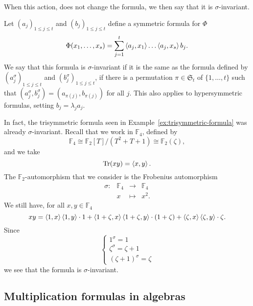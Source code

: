 When this action, does not change the formula, we then say that it is
$\sigma$-invariant.
\begin{defi}
  Let $(a_j)_{1\leq j\leq t}$ and
$(b_j)_{1\leq j\leq t}$ define a symmetric formula for $\Phi$
  \[
    \Phi(x_1, \dots, x_s) = \sum_{j=1}^t\left\langle a_j,x_1\right\rangle\dots\left\langle a_j,x_s\right\rangle b_j.
  \]
We say that this
formula is $\sigma$-invariant if it is the same as the formula defined by
$(a_j^\sigma)_{1\leq j\leq t}$ and $(b_j^\sigma)_{1\leq j\leq t}$,
\ie if there is a permutation $\pi\in\mathfrak S_t$ of $\{1,\dots,t\}$ such that
$(a_j^\sigma,b_j^\sigma)=(a_{\pi(j)},b_{\pi(j)})$ for all $j$. This also applies
to hypersymmetric formulas, setting $b_j=\lambda_j a_j$. 
\end{defi}
\begin{ex}
  In fact, the trisymmetric formula seen in
  Example~\ref{ex:trisymmetric-formula} was already $\sigma$-invariant. Recall
  that we work in $\mathbb{F}_4$, defined by
  \[
   \mathbb{F}_4\cong\mathbb{F}_2[T]/(T^2+T+1)\cong\mathbb{F}_2(\zeta),
  \]
  and we take
\[
  \operatorname{Tr}(xy) = \left\langle x,y\right\rangle.
\]
The $\mathbb{F}_2$-automorphism that we consider is the Frobenius automorphism
\[
  \begin{array}{cccc}
    \sigma: & \mathbb{F}_4 & \to & \mathbb{F}_4 \\
    & x & \mapsto & x^2.
  \end{array}
\]
We still have, for all $x, y\in\mathbb{F}_4$
\[
  xy =
  \left\langle1,x\right\rangle\left\langle1,y\right\rangle\cdot1+\left\langle1+\zeta,x\right\rangle\left\langle1+\zeta,y\right\rangle\cdot(1+\zeta)+\left\langle\zeta,x\right\rangle\left\langle\zeta,y\right\rangle\cdot\zeta.
\]
Since
\[
\left\{ 
  \begin{array}{l}
    1^\sigma = 1 \\
    \zeta^\sigma=\zeta+1\\
    (\zeta+1)^\sigma=\zeta
  \end{array}
\right.
\]
we see that the formula is $\sigma$-invariant.
\end{ex}

\subsection{Multiplication formulas in algebras}
\label{sec:formulas-algebras}

